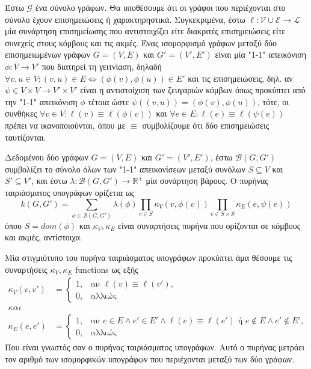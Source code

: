 Έστω $\mathcal{G}$ ένα σύνολο γράφων.
Θα υποθέσουμε ότι οι γράφοι που περιέχονται στο σύνολο έχουν επισημειώσεις ή χαρακτηρηστικά.
Συγκεκριμένα, έστω $\ell : \mathcal{V} \cup \mathcal{E} \rightarrow \mathcal{L}$ μία συνάρτηση επισημείωσης που αντιστοιχίζει είτε διακριτές επισημειώσεις είτε συνεχείς στους κόμβους και τις ακμές.
Ένας ισομορφισμό γράφων μεταξύ δύο επισημειωμένων γράφων $G=(V,E)$ και $G'=(V',E')$ είναι μία "1-1" απεικόνιση $\phi : V \rightarrow V'$ που διατηρεί τη γειτνίαση, δηλαδή $\forall v,u \in V : (v,u) \in E \Leftrightarrow (\phi(v), \phi(u)) \in E'$ και τις επισημειώσεις, δηλ. αν $\psi \in V \times V \rightarrow V' \times V'$ είναι η αντιστοίχιση των ζευγαριών κόμβων όπως προκύπτει από την "1-1" απεικόνιση $\phi$ τέτοια ώστε $\psi((v,u)) = (\phi(v), \phi(u))$, τότε, οι συνθήκες $\forall v \in V : \ell(v) \equiv \ell(\phi(v))$ και $\forall e \in E : \ell(e) \equiv \ell(\psi(e))$ πρέπει να ικανοποιούνται, όπου με $\equiv$ συμβολίζουμε ότι δύο επισημειώσεις ταυτίζονται.

Δεδομένου δύο γράφων $G=(V,E)$ και $G'=(V',E')$, έστω $\mathcal{B}(G,G')$ συμβολίζει το σύνολο όλων των "1-1" απεικονίσεων μεταξύ συνόλων $S \subseteq V$ και $S' \subseteq V'$, και έστω $\lambda : \mathcal{B}(G,G') \rightarrow \mathbb{R}^+$ μία συνάρτηση βάρους.
Ο πυρήνας ταιριάσματος υπογράφων ορίζετια ως
\begin{equation}
    k(G, G') = \sum_{\phi \in \mathcal{B}(G,G')} \lambda(\phi) \prod_{v \in S} \kappa_V(v, \phi(v)) \prod_{e \in S \times S} \kappa_E(e, \psi(e))
\end{equation}
όπου $S = dom(\phi)$ και $\kappa_V, \kappa_E$ είναι συναρτήσεις πυρήνα που ορίζονται σε κόμβους και ακμές, αντίστοιχα.

Μία στιγμιότυπο του πυρήνα ταιριάσματος υπογράφων προκύπτει άμα θέσουμε τις συναρτήσεις $\kappa_V, \kappa_E$ functions ως εξής
\begin{equation}
    \begin{split}
        \kappa_V(v,v') &= \begin{cases}
        1, & \text{αν $\ell(v) \equiv \ell(v')$},\\
        0, & \text{αλλιώς} 
        \end{cases}\\
        και\\
        \kappa_E(e,e') &= \begin{cases}
        1, & \text{αν $e \in E \wedge e' \in E' \wedge \ell(e) \equiv \ell(e')$ ή $e \not \in E \wedge e' \not \in E'$},\\
        0, & \text{αλλιώς}
        \end{cases}
    \end{split}
\end{equation}
Που είναι γνωστός σαν ο πυρήνας ταιριάσματος υπογράφων.
Αυτό ο πυρήνας μετράει τον αριθμό των ισομορφικών υπογράφων που περιέχονται μεταξύ των δύο γράφων.


